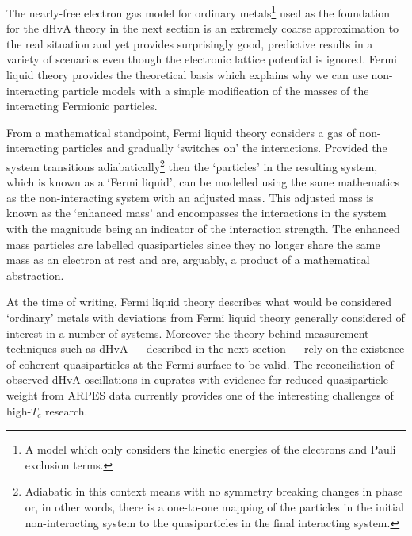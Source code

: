 The nearly-free electron gas model for ordinary metals\footnote{A model which only considers the kinetic energies of the electrons and Pauli exclusion terms.} used as the foundation for the \ac{dHvA} theory in the next section is an extremely coarse approximation to the real situation and yet provides surprisingly good, predictive results in a variety of scenarios even though the electronic lattice potential is ignored. Fermi liquid theory provides the theoretical basis which explains why we can use non-interacting particle models with a simple modification of the masses of the interacting Fermionic particles.

From a mathematical standpoint, Fermi liquid theory considers a gas of non-interacting particles and gradually `switches on' the interactions. Provided the system transitions adiabatically\footnote{Adiabatic in this context means with no symmetry breaking changes in phase or, in other words, there is a one-to-one mapping of the particles in the initial non-interacting system to the quasiparticles in the final interacting system.} then the `particles' in the resulting system, which is known as a `Fermi liquid', can be modelled using the same mathematics as the non-interacting system with an adjusted mass. This adjusted mass is known as the `enhanced mass' and encompasses the interactions in the system with the magnitude being an indicator of the interaction strength. The enhanced mass particles are labelled quasiparticles since they no longer share the same mass as an electron at rest and are, arguably, a product of a mathematical abstraction.

At the time of writing, Fermi liquid theory describes what would be considered `ordinary' metals with deviations from Fermi liquid theory generally considered of interest in a number of systems. Moreover the theory behind measurement techniques such as \ac{dHvA} --- described in the next section --- rely on the existence of coherent quasiparticles at the Fermi surface to be valid. The reconciliation of observed \ac{dHvA} oscillations in cuprates with evidence for reduced quasiparticle weight from \ac{ARPES} data currently provides one of the interesting challenges of high-$T_c$ research.

